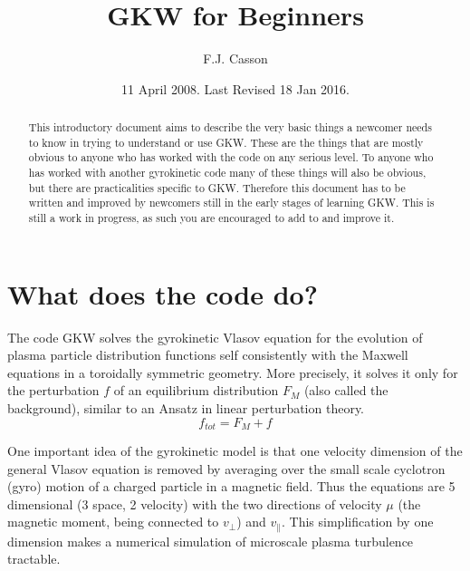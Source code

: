 \documentclass[a4paper,10pt]{article}
\title{GKW for Beginners}
\author{F.J. Casson}
\date{11 April 2008.  Last Revised 18 Jan 2016.}
\begin{document}
\maketitle


\begin{abstract} 

  This introductory document aims to describe the very basic things a
  newcomer needs to know in trying to understand or use GKW. These are
  the things that are mostly obvious to anyone who has worked with the
  code on any serious level.  To anyone who has worked with another
  gyrokinetic code many of these things will also be obvious, but
  there are practicalities specific to GKW.  Therefore this document
  has to be written and improved by newcomers still in the early
  stages of learning GKW.  This is still a work in progress, as such
  you are encouraged to add to and improve it.

\end{abstract}


\tableofcontents
\setlength{\parskip}{8pt}

\section{What does the code do?}

The code GKW solves the gyrokinetic Vlasov equation for the evolution
of plasma particle distribution functions self consistently with the
Maxwell equations in a toroidally symmetric geometry. More precisely,
it solves it only for the perturbation $f$ of an equilibrium
distribution $F_M$ (also called the background), similar to an Ansatz
in linear perturbation theory.
\begin{equation}
  f_{tot} = F_M + f
\end{equation}

One important idea of the gyrokinetic model is that one velocity
dimension of the general Vlasov equation is removed by averaging over
the small scale cyclotron (gyro) motion of a charged particle in a
magnetic field. Thus the equations are 5 dimensional (3 space, 2
velocity) with the two directions of velocity $\mu$ (the magnetic
moment, being connected to $v_\perp$) and $v_\parallel$.  This
simplification by one dimension makes a numerical simulation of
microscale plasma turbulence tractable.
\end{document}
